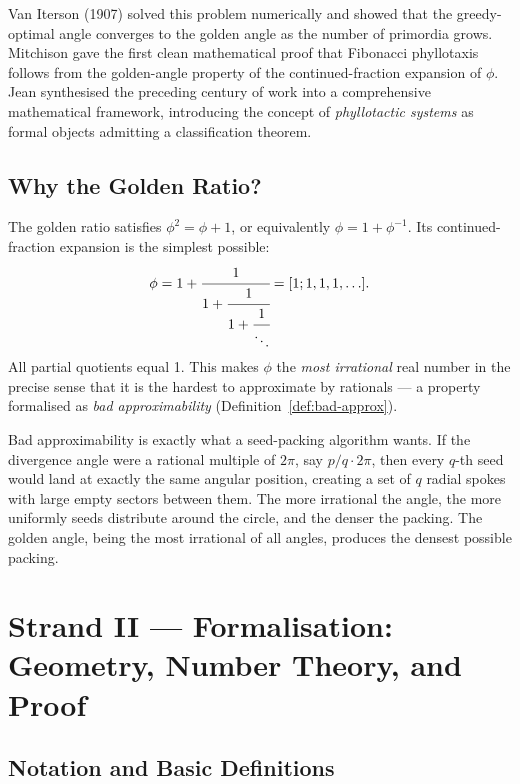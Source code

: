 Van Iterson (1907) solved this problem numerically and showed that the
greedy-optimal angle converges to the golden angle as the number of
primordia grows.  Mitchison \cite{mitchison1977phyllotaxis} gave the
first clean mathematical proof that Fibonacci phyllotaxis follows
from the golden-angle property of the continued-fraction expansion of
$\phi$.  Jean \cite{jean1994phyllotaxis} synthesised the preceding
century of work into a comprehensive mathematical framework, introducing
the concept of \emph{phyllotactic systems} as formal objects admitting
a classification theorem.

\subsection{Why the Golden Ratio?}
\label{subsec:why-phi}

The golden ratio satisfies $\phi^2 = \phi + 1$, or equivalently
$\phi = 1 + \phi^{-1}$.  Its continued-fraction expansion is the
simplest possible:
\[
  \phi = 1 + \cfrac{1}{1 + \cfrac{1}{1 + \cfrac{1}{\ddots}}} = [1; 1, 1, 1, \ldots].
\]
All partial quotients equal 1.  This makes $\phi$ the \emph{most
irrational} real number in the precise sense that it is the hardest to
approximate by rationals — a property formalised as \emph{bad
approximability} (Definition~\ref{def:bad-approx}).

Bad approximability is exactly what a seed-packing algorithm wants.
If the divergence angle were a rational multiple of $2\pi$, say
$p/q \cdot 2\pi$, then every $q$-th seed would land at exactly the
same angular position, creating a set of $q$ radial spokes with large
empty sectors between them.  The more irrational the angle, the more
uniformly seeds distribute around the circle, and the denser the
packing.  The golden angle, being the most irrational of all angles,
produces the densest possible packing.


\section{Strand II — Formalisation: Geometry, Number Theory, and Proof}
\label{sec:bloom-formal}

\subsection{Notation and Basic Definitions}
\label{subsec:notation}

